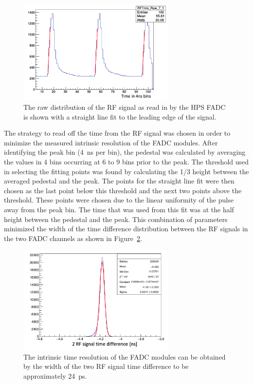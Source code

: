 \documentclass[12pt]{report}
\begin{document}
\begin{figure}[H]
  \centering
      \includegraphics[width=0.7\textwidth]{pics/performance/rfFits.png}
  \caption[Fitted, raw waveform of the RF signal in HPS]{The raw distribution of the RF signal as read in by the HPS FADC is shown with a straight line fit to the leading edge of the signal.}
  \label{Figure:rfFits}
\end{figure}

The strategy to read off the time from the RF signal was chosen in order to minimize the measured intrinsic resolution of the FADC modules. After identifying the peak bin (4~ns per bin), the pedestal was calculated by
averaging the values in 4 bins occurring at 6 to 9 bins prior to the peak. The threshold used in selecting the fitting points was found by calculating the 1/3 height between the averaged pedestal and the peak. The points for the straight line fit were then chosen as the last point below this threshold and the next two points above the threshold. These points were chosen due to the linear uniformity of the pulse away from the
peak bin. The time that was used from this fit was at the half height between the pedestal and the peak. This combination of parameters minimized the width of the time difference distribution between the RF signals in the two FADC channels as shown in Figure~\ref{Figure:intrTres}. 

\begin{figure}[H]
  \centering
      \includegraphics[width=0.7\textwidth]{pics/performance/rfRes.png}
  \caption[FADC intrinsic time resolution]{The intrinsic time resolution of the FADC modules can be obtained by the width of the two RF signal time difference to be approximately 24~ps.}
  \label{Figure:intrTres}
\end{figure}
\end{document}
